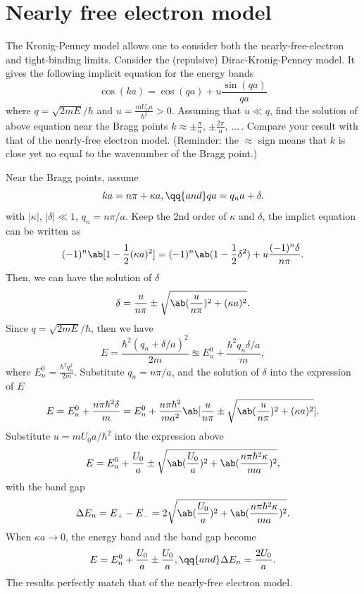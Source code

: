 
\section{Nearly free electron model}

\begin{problem}
  The Kronig-Penney model allows one to consider both the nearly-free-electron
  and tight-binding limits. Consider the (repulsive) Dirac-Kronig-Penney model.
  It gives the following implicit equation for the energy bands
  \[
    \cos(ka) = \cos(qa) + u\frac{\sin(qa)}{qa}
  \]
  where $q = \sqrt{2mE}/\hbar$ and $u = \frac{mU_0a}{\hbar^2} > 0$. Assuming
  that $u \ll q$, find the solution of above equation near the Bragg points
  $k \approx \pm\frac\pi a$, $\pm\frac{2\pi}{a}$, $\ldots\,$. Compare your
  result with that of the nearly-free electron model. (Reminder: the $\approx$
  sign means that $k$ is close yet no equal to the wavenumber of the Bragg
  point.)
\end{problem}
\begin{solution}
  Near the Bragg points, assume
  \[
    ka = n\pi + \kappa a, \qq{and}
    qa = q_n a + \delta.
  \]
  with $|\kappa|$, $|\delta| \ll 1$, $q_n = n\pi/a$.
  Keep the 2nd order of $\kappa$ and $\delta$, the implict equation can be
  written as
  \[
    (-1)^n \ab[1 - \frac12(\kappa a)^2] = (-1)^n \ab(1 - \frac12\delta^2)
                                        + u\frac{(-1)^n\delta}{n\pi}.
  \]
  Then, we can have the solution of $\delta$
  \[
    \delta = \frac u{n\pi} \pm \sqrt{\ab(\frac u{n\pi})^2 + (\kappa a)^2}.
  \]
  Since $q = \sqrt{2mE}/\hbar$, then we have
  \[
    E = \frac{\hbar^2(q_n + \delta/a)^2}{2m}
      \approxeq E_n^0 + \frac{\hbar^2 q_n \delta/a}{m},
  \]
  where $E_n^0 = \frac{\hbar^2q_n^2}{2m}$.
  Substitute $q_n = n\pi/a$, and the solution of $\delta$ into the expression
  of $E$
  \[
    E = E_n^0 + \frac{n\pi\hbar^2\delta}{m}
  = E_n^0 + \frac{n\pi\hbar^2}{ma^2}
            \ab[\frac{u}{n\pi} \pm
            \sqrt{\ab(\frac{u}{n\pi})^2 + (\kappa a)^2}].
  \]
  Substitute $u = mU_0a/\hbar^2$ into the expression above
  \[
    E = E_n^0 + \frac{U_0}{a} \pm
              \sqrt{\ab(\frac{U_0}{a})^2 + \ab(\frac{n\pi\hbar^2\kappa}{ma})^2},
  \]
  with the band gap
  \[
    \Delta E_n = E_+ - E_-
  = 2\sqrt{\ab(\frac{U_0}{a})^2 + \ab(\frac{n\pi\hbar^2\kappa}{ma})^2}.
  \]
  When $\kappa a \to 0$, the energy band and the band gap become
  \[
    E = E_n^0 + \frac{U_0}{a} \pm \frac{U_0}{a}, \qq{and}
    \Delta E_n = \frac{2U_0}{a}.
  \]
  The results perfectly match that of the nearly-free electron model.
\end{solution}

